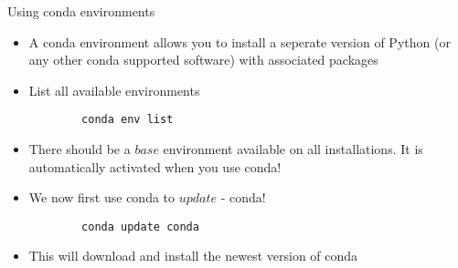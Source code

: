 \begin{frame}[fragile]{Using conda environments}
	
	\begin{itemize}
		\item A conda environment allows you to install a seperate version of Python (or any other conda supported software) with associated packages
		
		\item List all available environments
		\begin{verbatim}
		conda env list
		\end{verbatim}
		
		\item There should be a $base$ environment available on all installations. It is automatically activated when you use conda!
		\item We now first use conda to $update$ - conda!
		\begin{verbatim}
		conda update conda
		\end{verbatim}
		\item This will download and install the newest version of conda
	
	\end{itemize}
	
\end{frame}

